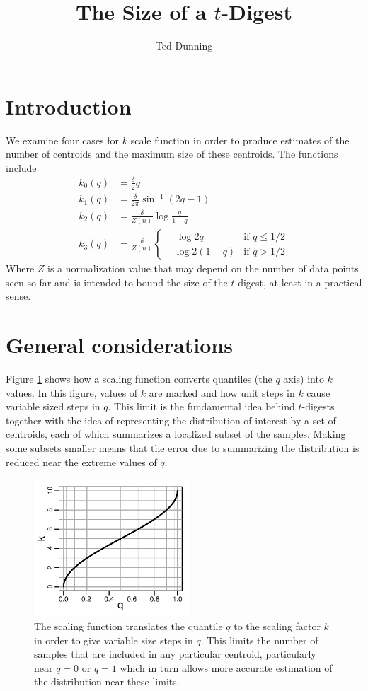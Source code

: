 \documentclass[11pt]{amsart}
\title{The Size of a $t$-Digest}
\author{Ted Dunning}
\date{}                                           %
\begin{document}
\maketitle
\section{Introduction}
We examine four cases for $k$ scale function in order to produce estimates of the number of centroids and the maximum size of these centroids. The functions include
\[
\begin{aligned}
k_0(q) &= \frac \delta 2 q \\
k_1(q) &= \frac \delta {2\pi}  \sin^{-1}(2q-1)   \\
k_2(q) &= \frac \delta {Z(n)} \log {\frac q {1-q}} \\
k_3(q) &= \frac \delta {Z(n)}\begin{cases}
\quad \log 2q & \text{if  } q \le 1/2 \\
- \log 2(1-q) & \text{if  } q > 1/2
\end{cases}
\end{aligned}
\]
Where $Z$ is a normalization value that may depend on the number of data points seen so far and is intended to bound the size of the $t$-digest, at least in a practical sense.
\section{General considerations}
Figure \ref{fig:k-q-plot-full} shows how a scaling function converts quantiles (the $q$ axis) into $k$ values. In this figure, values of $k$ are marked  and how unit steps in $k$ cause variable sized steps in $q$. This limit is the fundamental idea behind $t$-digests together with the idea of representing the distribution of interest by a set of centroids, each of which summarizes a localized subset of the samples. Making some subsets smaller means that the error due to summarizing the distribution is reduced near the extreme values of $q$.
\begin{figure}[htbp] %
   \centering
   \includegraphics[width=2.3in]{k-q-plot.pdf} 
   \caption{The scaling function translates the quantile $q$ to the scaling factor $k$ in order to give variable size steps in $q$. This limits the number of samples that are included in any particular centroid, particularly near $q=0$ or $q=1$ which in turn allows more accurate estimation of the distribution near these limits. }
   \label{fig:k-q-plot-full}
\end{figure}
\end{document}
